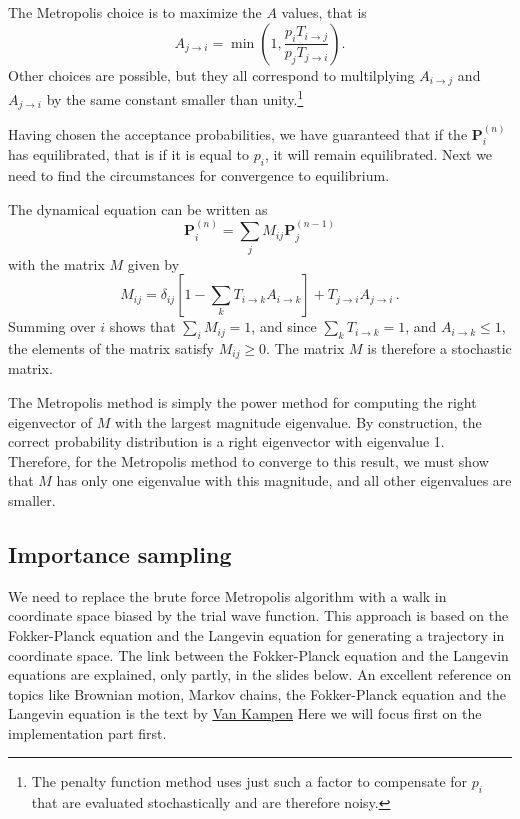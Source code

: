 The Metropolis choice is to maximize the $A$ values, that is
\[
A_{j \rightarrow i} = \min \left ( 1,
\frac{p_iT_{i\rightarrow j}}{ p_jT_{j\rightarrow i}}\right ).
\]
Other choices are possible, but they all correspond to multilplying
$A_{i\rightarrow j}$ and $A_{j\rightarrow i}$ by the same constant
smaller than unity.\footnote{The penalty function method uses just such
a factor to compensate for $p_i$ that are evaluated stochastically
and are therefore noisy.}

Having chosen the acceptance probabilities, we have guaranteed that
if the  $\mathbf{P}_i^{(n)}$ has equilibrated, that is if it is equal to $p_i$,
it will remain equilibrated. Next we need to find the circumstances for
convergence to equilibrium.

The dynamical equation can be written as
\[
\mathbf{P}^{(n)}_i = \sum_j M_{ij}\mathbf{P}^{(n-1)}_j
\]
with the matrix $M$ given by
\[
M_{ij} = \delta_{ij}\left [ 1 -\sum_k T_{i\rightarrow k} A_{i \rightarrow k}
\right ] + T_{j\rightarrow i} A_{j\rightarrow i} \,.
\]
Summing over $i$ shows that $\sum_i M_{ij} = 1$, and since
$\sum_k T_{i\rightarrow k} = 1$, and $A_{i \rightarrow k} \leq 1$, the
elements of the matrix satisfy $M_{ij} \geq 0$. The matrix $M$ is therefore
a stochastic matrix.

The Metropolis method is simply the power method for computing the
right eigenvector of $M$ with the largest magnitude eigenvalue.
By construction, the correct probability distribution is a right eigenvector
with eigenvalue 1. Therefore, for the Metropolis method to converge
to this result, we must show that $M$ has only one eigenvalue with this
magnitude, and all other eigenvalues are smaller.

\subsection*{Importance sampling}

We need to replace the brute force
Metropolis algorithm with a walk in coordinate space biased by the trial wave function.
This approach is based on the Fokker-Planck equation and the Langevin equation for generating a trajectory in coordinate space.  The link between the Fokker-Planck equation and the Langevin equations are explained, only partly, in the slides below.
An excellent reference on topics like Brownian motion, Markov chains, the Fokker-Planck equation and the Langevin equation is the text by  \href{{http://www.elsevier.com/books/stochastic-processes-in-physics-and-chemistry/van-kampen/978-0-444-52965-7}}{Van Kampen}
Here we will focus first on the implementation part first.

